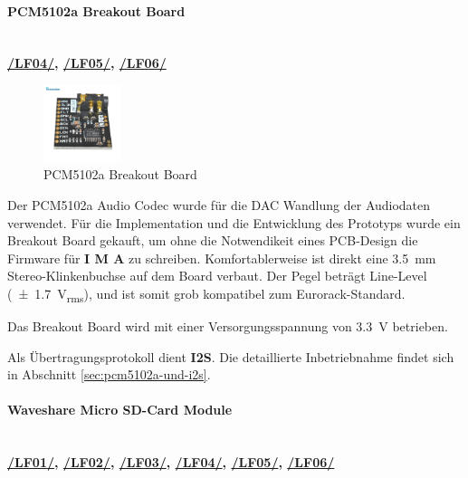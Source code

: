 \newpage



\paragraph{PCM5102a Breakout Board}\mbox{}\\

\textbf{\hyperlink{lf-audiorecord}{/LF04/}, \hyperlink{lf-audioplayback}{/LF05/}, \hyperlink{lf-pitchaudio}{/LF06/}} \\

\begin{figure} %
	\vspace{-20pt}
	\centering
	\includegraphics[width=0.2\textwidth]{images/05_technische_spezifikation/audio/pcm5102a_breakout.jpg}
	\caption{PCM5102a Breakout Board}
	\label{fig:pcm5102a_breakout}
\end{figure}


Der PCM5102a Audio Codec wurde für die DAC Wandlung der Audiodaten verwendet. Für die Implementation und die Entwicklung des Prototyps wurde ein Breakout Board gekauft, um ohne die Notwendikeit eines PCB-Design die Firmware für \textbf{I M A} zu schreiben. 
Komfortablerweise ist direkt eine \SI{3,5}{\milli\meter} Stereo-Klinkenbuchse auf dem Board verbaut.
Der Pegel beträgt Line-Level (\SI{\pm 1.7}{\volt_{rms}}), und ist somit grob kompatibel zum Eurorack-Standard.

Das Breakout Board wird mit einer Versorgungsspannung von \SI{3,3}{\volt} betrieben.

Als Übertragungsprotokoll dient \textbf{I2S}. Die detaillierte Inbetriebnahme findet sich in Abschnitt \ref{sec:pcm5102a-und-i2s}.

\vspace{4em}

\paragraph{Waveshare Micro SD-Card Module}\mbox{}\\

\textbf{{\hyperlink{LF01_Link}{/LF01/}, \hyperlink{LF02_Link}{/LF02/}, \hyperlink{lf-nn-01}{/LF03/}, \hyperlink{lf-audiorecord}{/LF04/}, \hyperlink{lf-audioplayback}{/LF05/}, \hyperlink{lf-pitchaudio}{/LF06/}}} \\

